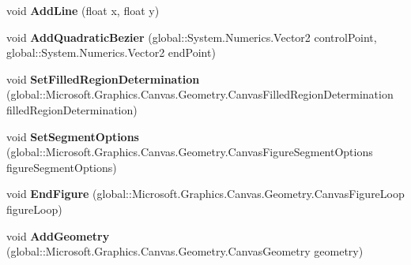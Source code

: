 \begin{DoxyCompactItemize}
void {\bfseries Add\+Line} (float x, float y)
\item 
\mbox{\label{interface_microsoft_1_1_graphics_1_1_canvas_1_1_geometry_1_1_i_canvas_path_builder_ac8de702afe0be29d6775abc66e63ac50}} 
void {\bfseries Add\+Quadratic\+Bezier} (global\+::\+System.\+Numerics.\+Vector2 control\+Point, global\+::\+System.\+Numerics.\+Vector2 end\+Point)
\item 
\mbox{\label{interface_microsoft_1_1_graphics_1_1_canvas_1_1_geometry_1_1_i_canvas_path_builder_acc584830d3f1748c8144e3800c457004}} 
void {\bfseries Set\+Filled\+Region\+Determination} (global\+::\+Microsoft.\+Graphics.\+Canvas.\+Geometry.\+Canvas\+Filled\+Region\+Determination filled\+Region\+Determination)
\item 
\mbox{\label{interface_microsoft_1_1_graphics_1_1_canvas_1_1_geometry_1_1_i_canvas_path_builder_af370ca945a2f94ff7cc968d77512fd8d}} 
void {\bfseries Set\+Segment\+Options} (global\+::\+Microsoft.\+Graphics.\+Canvas.\+Geometry.\+Canvas\+Figure\+Segment\+Options figure\+Segment\+Options)
\item 
\mbox{\label{interface_microsoft_1_1_graphics_1_1_canvas_1_1_geometry_1_1_i_canvas_path_builder_a9ce31a3bed6a5118d4e16140a1c21484}} 
void {\bfseries End\+Figure} (global\+::\+Microsoft.\+Graphics.\+Canvas.\+Geometry.\+Canvas\+Figure\+Loop figure\+Loop)
\item 
\mbox{\label{interface_microsoft_1_1_graphics_1_1_canvas_1_1_geometry_1_1_i_canvas_path_builder_aa46920a62d2d31a461ff0078c07432cf}} 
void {\bfseries Add\+Geometry} (global\+::\+Microsoft.\+Graphics.\+Canvas.\+Geometry.\+Canvas\+Geometry geometry)
\item 
\mbox{\label{interface_microsoft_1_1_graphics_1_1_canvas_1_1_geometry_1_1_i_canvas_path_builder_afe2a6e4649d8c29aaa44335cebe61dc5}} 

\end{DoxyCompactItemize}
